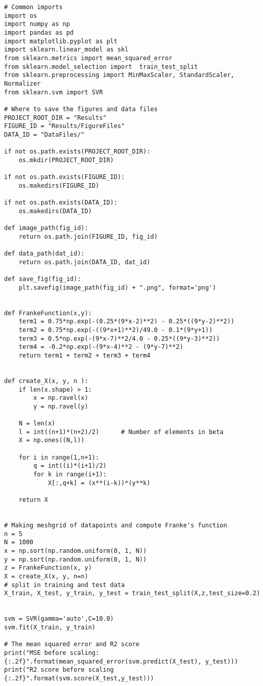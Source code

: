 \documentclass[%
oneside,                 %
final,                   %
10pt]{article}
\begin{document}
\begin{verbatim}
# Common imports
import os
import numpy as np
import pandas as pd
import matplotlib.pyplot as plt
import sklearn.linear_model as skl
from sklearn.metrics import mean_squared_error
from sklearn.model_selection import  train_test_split
from sklearn.preprocessing import MinMaxScaler, StandardScaler, Normalizer
from sklearn.svm import SVR

# Where to save the figures and data files
PROJECT_ROOT_DIR = "Results"
FIGURE_ID = "Results/FigureFiles"
DATA_ID = "DataFiles/"

if not os.path.exists(PROJECT_ROOT_DIR):
    os.mkdir(PROJECT_ROOT_DIR)

if not os.path.exists(FIGURE_ID):
    os.makedirs(FIGURE_ID)

if not os.path.exists(DATA_ID):
    os.makedirs(DATA_ID)

def image_path(fig_id):
    return os.path.join(FIGURE_ID, fig_id)

def data_path(dat_id):
    return os.path.join(DATA_ID, dat_id)

def save_fig(fig_id):
    plt.savefig(image_path(fig_id) + ".png", format='png')


def FrankeFunction(x,y):
	term1 = 0.75*np.exp(-(0.25*(9*x-2)**2) - 0.25*((9*y-2)**2))
	term2 = 0.75*np.exp(-((9*x+1)**2)/49.0 - 0.1*(9*y+1))
	term3 = 0.5*np.exp(-(9*x-7)**2/4.0 - 0.25*((9*y-3)**2))
	term4 = -0.2*np.exp(-(9*x-4)**2 - (9*y-7)**2)
	return term1 + term2 + term3 + term4


def create_X(x, y, n ):
	if len(x.shape) > 1:
		x = np.ravel(x)
		y = np.ravel(y)

	N = len(x)
	l = int((n+1)*(n+2)/2)		# Number of elements in beta
	X = np.ones((N,l))

	for i in range(1,n+1):
		q = int((i)*(i+1)/2)
		for k in range(i+1):
			X[:,q+k] = (x**(i-k))*(y**k)

	return X


# Making meshgrid of datapoints and compute Franke's function
n = 5
N = 1000
x = np.sort(np.random.uniform(0, 1, N))
y = np.sort(np.random.uniform(0, 1, N))
z = FrankeFunction(x, y)
X = create_X(x, y, n=n)    
# split in training and test data
X_train, X_test, y_train, y_test = train_test_split(X,z,test_size=0.2)


svm = SVR(gamma='auto',C=10.0)
svm.fit(X_train, y_train)

# The mean squared error and R2 score
print("MSE before scaling: {:.2f}".format(mean_squared_error(svm.predict(X_test), y_test)))
print("R2 score before scaling {:.2f}".format(svm.score(X_test,y_test)))


\end{verbatim}
\end{document}
